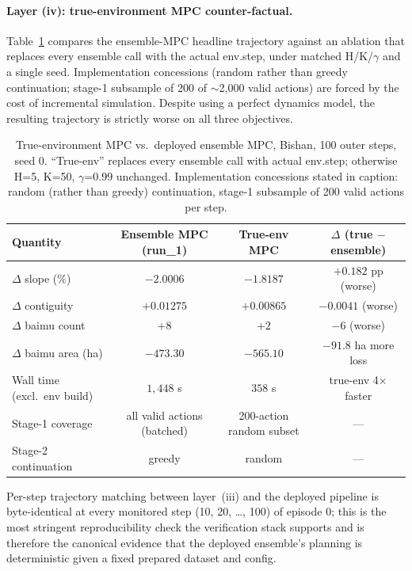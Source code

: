 \documentclass[11pt]{article}
\begin{document}
\paragraph{Layer (iv): true-environment MPC counter-factual.} Table~\ref{tab:si-trueenv} compares the ensemble-MPC headline trajectory against an ablation that replaces every ensemble call with the actual env.step, under matched H/K/$\gamma$ and a single seed. Implementation concessions (random rather than greedy continuation; stage-1 subsample of 200 of $\sim$2{,}000 valid actions) are forced by the cost of incremental simulation. Despite using a perfect dynamics model, the resulting trajectory is strictly worse on all three objectives.

\begin{table}[htbp]
\centering
\small
\caption{True-environment MPC vs.\ deployed ensemble MPC, Bishan, 100 outer steps, seed 0. ``True-env'' replaces every ensemble call with actual env.step; otherwise H=5, K=50, $\gamma$=0.99 unchanged. Implementation concessions stated in caption: random (rather than greedy) continuation, stage-1 subsample of 200 valid actions per step.}
\label{tab:si-trueenv}
\begin{tabular}{lccc}
\toprule
Quantity & Ensemble MPC (run\_1) & True-env MPC & $\Delta$ (true $-$ ensemble) \\
\midrule
$\Delta$ slope (\%) & $-2.0006$ & $-1.8187$ & $+0.182$ pp (worse) \\
$\Delta$ contiguity & $+0.01275$ & $+0.00865$ & $-0.0041$ (worse) \\
$\Delta$ baimu count & $+8$ & $+2$ & $-6$ (worse) \\
$\Delta$ baimu area (ha) & $-473.30$ & $-565.10$ & $-91.8$ ha more loss \\
Wall time (excl.\ env build) & $1{,}448$ s & $358$ s & true-env 4$\times$ faster \\
Stage-1 coverage & all valid actions (batched) & 200-action random subset & — \\
Stage-2 continuation & greedy & random & — \\
\bottomrule
\end{tabular}
\end{table}

Per-step trajectory matching between layer~(iii) and the deployed pipeline is byte-identical at every monitored step (10, 20, \ldots, 100) of episode 0; this is the most stringent reproducibility check the verification stack supports and is therefore the canonical evidence that the deployed ensemble's planning is deterministic given a fixed prepared dataset and config.
\end{document}
